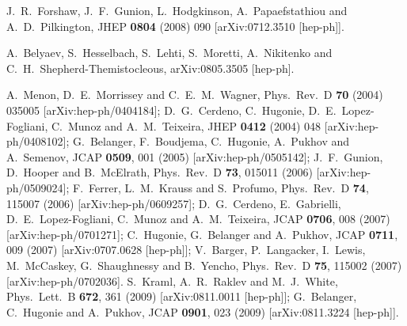 \documentclass[aps,prl,twocolumn,nofootinbib,superscriptaddress]{revtex4}
\begin{document}
{\begin{thebibliography}{99}
  J.~R.~Forshaw, J.~F.~Gunion, L.~Hodgkinson, A.~Papaefstathiou and A.~D.~Pilkington,
  JHEP {\bf 0804} (2008) 090
  [arXiv:0712.3510 [hep-ph]].  
  
  A.~Belyaev, S.~Hesselbach, S.~Lehti, S.~Moretti, 
  A.~Nikitenko and C.~H.~Shepherd-Themistocleous,
  arXiv:0805.3505 [hep-ph]. 
  
A.~Menon, D.~E.~Morrissey and C.~E.~M.~Wagner,
  Phys.\ Rev.\  D {\bf 70} (2004) 035005
  [arXiv:hep-ph/0404184];
  D.~G.~Cerdeno, C.~Hugonie, D.~E.~Lopez-Fogliani, C.~Munoz and A.~M.~Teixeira,
  JHEP {\bf 0412} (2004) 048
  [arXiv:hep-ph/0408102];
  G.~Belanger, F.~Boudjema, C.~Hugonie, A.~Pukhov and A.~Semenov,
  JCAP {\bf 0509}, 001 (2005)
  [arXiv:hep-ph/0505142];
  J.~F.~Gunion, D.~Hooper and B.~McElrath,
  Phys.\ Rev.\  D {\bf 73}, 015011 (2006)
  [arXiv:hep-ph/0509024];
  F.~Ferrer, L.~M.~Krauss and S.~Profumo,
  Phys.\ Rev.\  D {\bf 74}, 115007 (2006)
  [arXiv:hep-ph/0609257];
   D.~G.~Cerdeno, E.~Gabrielli, D.~E.~Lopez-Fogliani, C.~Munoz and A.~M.~Teixeira,
  JCAP {\bf 0706}, 008 (2007)
  [arXiv:hep-ph/0701271];
  C.~Hugonie, G.~Belanger and A.~Pukhov,
  JCAP {\bf 0711}, 009 (2007)
  [arXiv:0707.0628 [hep-ph]];
  V.~Barger, P.~Langacker, I.~Lewis, M.~McCaskey, G.~Shaughnessy and B.~Yencho,
  Phys.\ Rev.\  D {\bf 75}, 115002 (2007)
  [arXiv:hep-ph/0702036].
  S.~Kraml, A.~R.~Raklev and M.~J.~White,
  Phys.\ Lett.\  B {\bf 672}, 361 (2009)
  [arXiv:0811.0011 [hep-ph]];
  G.~Belanger, C.~Hugonie and A.~Pukhov,
  JCAP {\bf 0901}, 023 (2009)
  [arXiv:0811.3224 [hep-ph]].
  



\end{thebibliography}}
\end{document}
